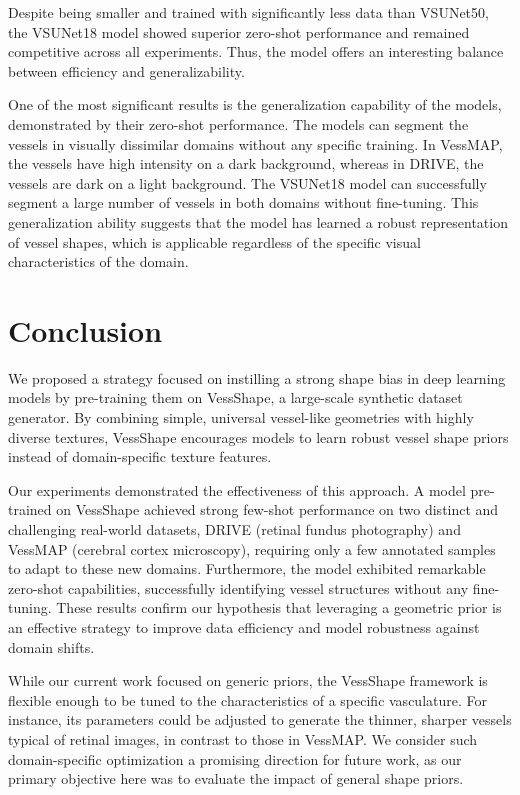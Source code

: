 \documentclass[%
reprint,
nofootinbib,
 amsmath,amssymb,
aps,
superscriptaddress,
showkeys,
longbibliography
]{revtex4-1}
\begin{document}
Despite being smaller and trained with significantly less data than VSUNet50, the VSUNet18 model showed superior zero-shot performance and remained competitive across all experiments. Thus, the model offers an interesting balance between efficiency and generalizability.

One of the most significant results is the generalization capability of the models, demonstrated by their zero-shot performance. The models can segment the vessels in visually dissimilar domains without any specific training. In VessMAP, the vessels have high intensity on a dark background, whereas in DRIVE, the vessels are dark on a light background. The VSUNet18 model can successfully segment a large number of vessels in both domains without fine-tuning. This generalization ability suggests that the model has learned a robust representation of vessel shapes, which is applicable regardless of the specific visual characteristics of the domain.

\section{Conclusion}
\label{s:conclusion}

We proposed a strategy focused on instilling a strong shape bias in deep learning models by pre-training them on VessShape, a large-scale synthetic dataset generator. By combining simple, universal vessel-like geometries with highly diverse textures, VessShape encourages models to learn robust vessel shape priors instead of domain-specific texture features.

Our experiments demonstrated the effectiveness of this approach. A model pre-trained on VessShape achieved strong few-shot performance on two distinct and challenging real-world datasets, DRIVE (retinal fundus photography) and VessMAP (cerebral cortex microscopy), requiring only a few annotated samples to adapt to these new domains. Furthermore, the model exhibited remarkable zero-shot capabilities, successfully identifying vessel structures without any fine-tuning. These results confirm our hypothesis that leveraging a geometric prior is an effective strategy to improve data efficiency and model robustness against domain shifts.

While our current work focused on generic priors, the VessShape framework is flexible enough to be tuned to the characteristics of a specific vasculature. For instance, its parameters could be adjusted to generate the thinner, sharper vessels typical of retinal images, in contrast to those in VessMAP. We consider such domain-specific optimization a promising direction for future work, as our primary objective here was to evaluate the impact of general shape priors.
\end{document}
